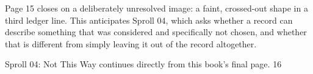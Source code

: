 \documentclass[12pt]{book}
\newcommand{\pagenum}[1]{\vfill{\color{gray!50}\footnotesize #1}}
\begin{document}
\vspace{0.15in}
Page 15 closes on a deliberately unresolved image: a faint, crossed-out shape in a third ledger line. This anticipates Sproll 04, which asks whether a record can describe something that was considered and specifically not chosen, and whether that is different from simply leaving it out of the record altogether.

\vspace{0.3in}
{\small Sproll 04: Not This Way continues directly from this book's final page.}
\pagenum{16}
\end{document}
